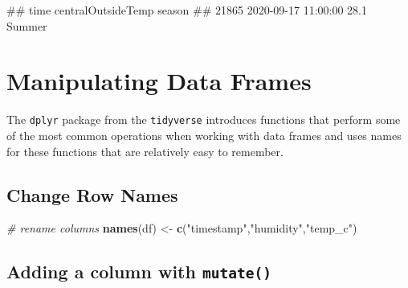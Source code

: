 \documentclass[
  a4paperpaper,
]{book}
\newenvironment{Shaded}{\begin{snugshade}}{\end{snugshade}}
\newcommand{\CommentTok}[1]{\textcolor[rgb]{0.56,0.35,0.01}{\textit{#1}}}
\newcommand{\DataTypeTok}[1]{\textcolor[rgb]{0.13,0.29,0.53}{#1}}
\newcommand{\DecValTok}[1]{\textcolor[rgb]{0.00,0.00,0.81}{#1}}
\newcommand{\FloatTok}[1]{\textcolor[rgb]{0.00,0.00,0.81}{#1}}
\newcommand{\KeywordTok}[1]{\textcolor[rgb]{0.13,0.29,0.53}{\textbf{#1}}}
\newcommand{\NormalTok}[1]{#1}
\newcommand{\OperatorTok}[1]{\textcolor[rgb]{0.81,0.36,0.00}{\textbf{#1}}}
\newcommand{\StringTok}[1]{\textcolor[rgb]{0.31,0.60,0.02}{#1}}
\let\oldShaded\Shaded
\let\endoldShaded\endShaded
\renewenvironment{Shaded}{\footnotesize\oldShaded}{\endoldShaded}
\let\oldverbatim\verbatim
\let\endoldverbatim\endverbatim
\renewenvironment{verbatim}{\footnotesize\oldverbatim}{\endoldverbatim}
\begin{document}
\begin{verbatim}
##                      time centralOutsideTemp season
## 21865 2020-09-17 11:00:00               28.1 Summer
\end{verbatim}

\newpage

\hypertarget{manipulating-data-frames}{%
\section{Manipulating Data Frames}\label{manipulating-data-frames}}

The \texttt{dplyr} package from the \texttt{tidyverse} introduces functions that perform some of the most common operations when working with data frames and uses names for these functions that are relatively easy to remember.

\hypertarget{change-row-names}{%
\subsection{Change Row Names}\label{change-row-names}}

\begin{Shaded}
\begin{Highlighting}[]
\CommentTok{# rename columns}
\KeywordTok{names}\NormalTok{(df) <-}\StringTok{ }\KeywordTok{c}\NormalTok{(}\StringTok{"timestamp"}\NormalTok{,}\StringTok{"humidity"}\NormalTok{,}\StringTok{"temp_c"}\NormalTok{)}
\end{Highlighting}
\end{Shaded}

\hypertarget{adding-a-column-with-mutate}{%
\subsection{\texorpdfstring{Adding a column with \texttt{mutate()}}{Adding a column with mutate()}}\label{adding-a-column-with-mutate}}

\begin{Shaded}
\end{Shaded}
\end{document}
